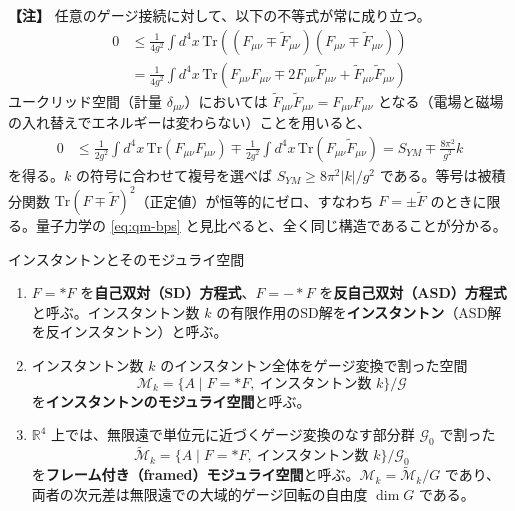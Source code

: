 \documentclass[uplatex, dvipdfmx, book]{jsbook}
\newenvironment{note}{\vspace{1ex}\par\footnotesize\noindent\textbf{【注】}}{\par\vspace{1ex}}
\begin{document}
\begin{note}
任意のゲージ接続に対して、以下の不等式が常に成り立つ。
\begin{align*}
    0 &\le \frac{1}{4g^2} \int d^4x \, \mathrm{Tr}\left( (F_{\mu\nu} \mp \tilde{F}_{\mu\nu})(F_{\mu\nu} \mp \tilde{F}_{\mu\nu}) \right) \\
    &= \frac{1}{4g^2} \int d^4x \, \mathrm{Tr}\left( F_{\mu\nu} F_{\mu\nu} \mp 2F_{\mu\nu} \tilde{F}_{\mu\nu} + \tilde{F}_{\mu\nu} \tilde{F}_{\mu\nu} \right)
\end{align*}
ユークリッド空間（計量 $\delta_{\mu\nu}$）においては $\tilde{F}_{\mu\nu} \tilde{F}_{\mu\nu} = F_{\mu\nu} F_{\mu\nu}$ となる（電場と磁場の入れ替えでエネルギーは変わらない）ことを用いると、
\begin{align*}
    0 &\le \frac{1}{2g^2} \int d^4x \, \mathrm{Tr}(F_{\mu\nu} F_{\mu\nu}) \mp \frac{1}{2g^2} \int d^4x \, \mathrm{Tr}(F_{\mu\nu} \tilde{F}_{\mu\nu}) = S_{YM} \mp \frac{8\pi^2}{g^2} k
\end{align*}
を得る。$k$ の符号に合わせて複号を選べば $S_{YM} \ge 8\pi^2|k|/g^2$ である。等号は被積分関数 $\mathrm{Tr}(F \mp \tilde{F})^2$（正定値）が恒等的にゼロ、すなわち $F = \pm\tilde{F}$ のときに限る。量子力学の \eqref{eq:qm-bps} と見比べると、全く同じ構造であることが分かる。
\end{note}

\begin{mydef}{インスタントンとそのモジュライ空間}{}
\begin{enumerate}
    \item $F = *F$ を\textbf{自己双対（SD）方程式}、$F = -*F$ を\textbf{反自己双対（ASD）方程式}と呼ぶ。インスタントン数 $k$ の有限作用のSD解を\textbf{インスタントン}（ASD解を反インスタントン）と呼ぶ。
    \item インスタントン数 $k$ のインスタントン全体をゲージ変換で割った空間
    \begin{equation*}
        \mathcal{M}_k = \{ A \mid F = *F,\ \text{インスタントン数 } k \} / \mathcal{G}
    \end{equation*}
    を\textbf{インスタントンのモジュライ空間}と呼ぶ。
    \item $\mathbb{R}^4$ 上では、無限遠で単位元に近づくゲージ変換のなす部分群 $\mathcal{G}_0$ で割った
    \begin{equation*}
        \widetilde{\mathcal{M}}_k = \{ A \mid F = *F,\ \text{インスタントン数 } k \} / \mathcal{G}_0
    \end{equation*}
    を\textbf{フレーム付き（framed）モジュライ空間}と呼ぶ。$\mathcal{M}_k = \widetilde{\mathcal{M}}_k / G$ であり、両者の次元差は無限遠での大域的ゲージ回転の自由度 $\dim G$ である。
\end{enumerate}
\end{mydef}
\end{document}
